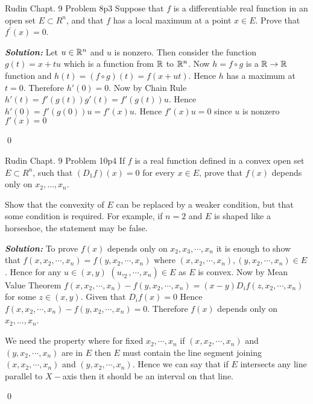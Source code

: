 \documentclass[a4paper, 11pt]{article}
\newcommand{\Qed}{\begin{flushright}\qed\end{flushright}}
\newcommand{\sol}[1]{\begin{solution}#1\end{solution}\Qed}
\newcommand{\parinn}{\setlength{\parindent}{1cm}}
\newenvironment{solution}
{\textbf{\textit{Solution: }}\setlength{\parindent}{1cm}}
{}
\begin{document}
	
	
	\begin{problem}{Rudin Chapt. 9 Problem 8}{p3%
		}
		Suppose that $f$ is a differentiable real function in an open set $E \subset R^{n}$, and that $f$ has a local maximum at a point $x \in E$. Prove that $f^{\prime}(x)=0$.
	\end{problem}
	
	\sol{Let $u\in \mathbb{R}^n$ and $u$ is nonzero. Then consider the function $g(t)=x+tu$ which is a function from $\mathbb{R}$ to $\mathbb{R}^n$. Now $h=f\circ g$ is a $\mathbb{R}\to\mathbb{R}$ function and $h(t)=(f\circ g)(t)=f(x+ut)$. Hence $h$ has a maximum at $t=0$. Therefore $h'(0)=0$. Now by Chain Rule $h'(t)=f'(g(t))g'(t)=f'(g(t))u$. Hence $h'(0)=f'(g(0))u=f'(x)u$. Hence $f'(x)u=0$ since $u$ is nonzero $f'(x)=0$}
	
	
	
	\begin{problem}{Rudin Chapt. 9 Problem 10}{p4%
		}
				If $f$ is a real function defined in a convex open set $E \subset R^{n}$, such that $\left(D_{1} f\right)(x)=0$ for every $x \in E$, prove that $f(x)$ depends only on $x_{2}, \ldots, x_{n}$.\parinn
				
				Show that the convexity of $E$ can be replaced by a weaker condition, but that some condition is required. For example, if $n=2$ and $E$ is shaped like a horseshoe, the statement may be false.
	\end{problem}
	
	\sol{To prove $f(x)$ depends only on $x_2,x_3,\cdots,x_n$ it is enough to show that $f(x,x_2,\cdots,x_n)=f(y,x_2,\cdots,x_n)$ where $(x,x_2,\cdots,x_n),(y,x_2,\cdots,x_n)\in E$. Hence for any $u\in (x,y)$ $(u,_2,\cdots,x_n)\in E$ as $E$ is convex. Now by Mean Value Theorem $f(x,x_2,\cdots,x_n)-f(y,x_2,\cdots,x_n)=(x-y)D_if(z,x_2,\cdots,x_n)$ for some $z\in (x,y)$. Given that $D_if(x)=0$ Hence $f(x,x_2,\cdots,x_n)-f(y,x_2,\cdots,x_n)=0$. Therefore $f(x)$ depends only on $x_{2}, \ldots, x_{n}$.
		
		We need the property where for fixed $x_2,\cdots,x_n$ if $(x,x_2,\cdots,x_n)$ and $(y,x_2,\cdots,x_n)$ are in $E$ then $E$ must contain the line segment joining $(x,x_2,\cdots,x_n)$ and $(y,x_2,\cdots,x_n)$. Hence we can say that if $E$ intersects any line parallel to $X-$axis then it should be an interval on that line.
	
}
	
\end{document}
